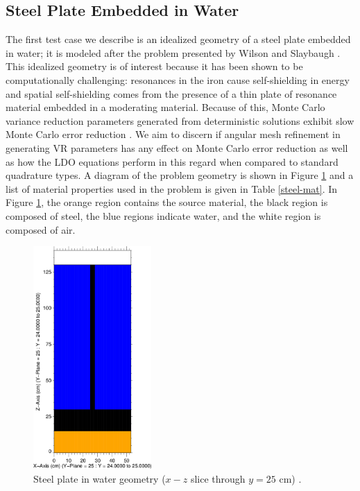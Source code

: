 \documentclass{article} %
\begin{document}
\subsection{Steel Plate Embedded in Water}
\label{sec:steel_params}

The first test case we describe is an idealized geometry of a steel plate
embedded in water; it is modeled after the problem presented by Wilson and
Slaybaugh \cite{wilsonslaybaugh}. This idealized geometry is of interest
because it has been shown to be computationally challenging: resonances in the
iron cause self-shielding in energy and spatial self-shielding comes from the
presence of a thin plate of resonance material embedded in a moderating
material. Because of this, Monte Carlo variance reduction parameters generated
from deterministic solutions exhibit slow Monte Carlo error reduction
\cite{wilsonslaybaugh}. We aim to discern if angular mesh refinement in
generating VR parameters has any effect on Monte Carlo error reduction as well
as how the LDO equations perform in this regard when compared to standard
quadrature types. A diagram of the problem geometry is shown in Figure
\ref{steelxz} and a list of material properties used in the problem is given
in Table \ref{steel-mat}. In Figure \ref{steelxz}, the orange region contains
the source material, the black region is composed of steel, the blue regions
indicate water, and the white region is composed of air.

\begin{figure}[!htb]
\centering
\includegraphics[width=0.4\textwidth]{steel-xz.png}
\caption{Steel plate in water geometry ($x-z$ slice through $y = 25$ cm) 
         \cite{wilsonslaybaugh}.}
\label{steelxz}
\end{figure}
\end{document}

